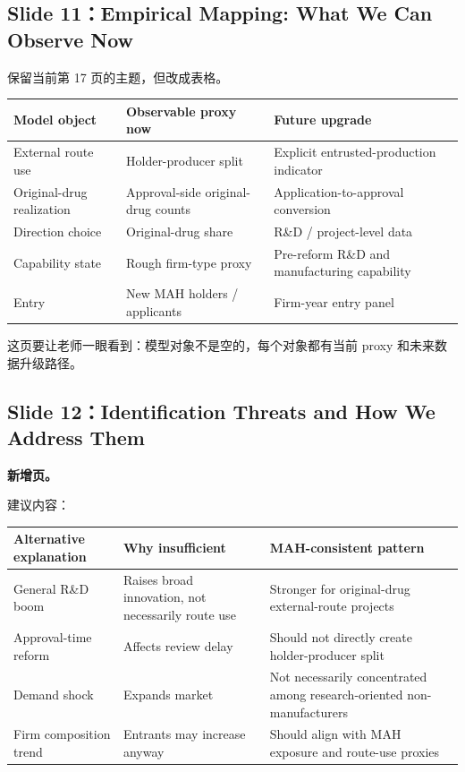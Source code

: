 \documentclass[12pt]{ctexart}
\begin{document}
\subsection{Slide 11：Empirical Mapping: What We Can Observe Now}

保留当前第 17 页的主题，但改成表格。

\begin{center}
\begin{tabularx}{0.95\textwidth}{Y Y Y}
\toprule
Model object & Observable proxy now & Future upgrade \\
\midrule
External route use & Holder-producer split & Explicit entrusted-production indicator \\
Original-drug realization & Approval-side original-drug counts & Application-to-approval conversion \\
Direction choice & Original-drug share & R\&D / project-level data \\
Capability state & Rough firm-type proxy & Pre-reform R\&D and manufacturing capability \\
Entry & New MAH holders / applicants & Firm-year entry panel \\
\bottomrule
\end{tabularx}
\end{center}

这页要让老师一眼看到：模型对象不是空的，每个对象都有当前 proxy 和未来数据升级路径。

\subsection{Slide 12：Identification Threats and How We Address Them}

\textbf{新增页。}

建议内容：
\begin{center}
\begin{tabularx}{0.95\textwidth}{Y Y Y}
\toprule
Alternative explanation & Why insufficient & MAH-consistent pattern \\
\midrule
General R\&D boom & Raises broad innovation, not necessarily route use & Stronger for original-drug external-route projects \\
Approval-time reform & Affects review delay & Should not directly create holder-producer split \\
Demand shock & Expands market & Not necessarily concentrated among research-oriented non-manufacturers \\
Firm composition trend & Entrants may increase anyway & Should align with MAH exposure and route-use proxies \\
\bottomrule
\end{tabularx}
\end{center}
\end{document}
